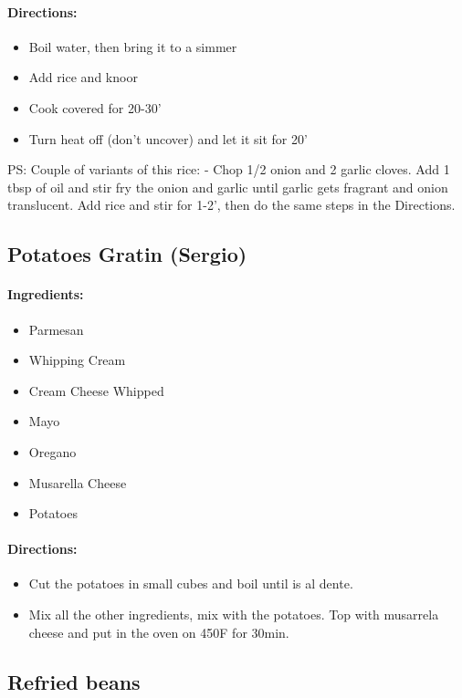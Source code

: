 \documentclass{article}
\begin{document}
\paragraph{Directions:}
\begin{itemize}
	\item Boil water, then bring it to a simmer
	\item Add rice and knoor
	\item Cook covered for 20-30'
	\item Turn heat off (don't uncover) and let it sit for 20'
\end{itemize} 

PS: Couple of variants of this rice: - Chop 1/2 onion and 2 garlic cloves. Add 1 tbsp of oil and stir fry the onion and garlic until garlic gets fragrant and onion translucent. Add rice and stir for 1-2’, then do the same
steps in the Directions.

\subsection{Potatoes Gratin (Sergio)}

\paragraph{Ingredients:}

\begin{itemize}
	\item Parmesan
	\item Whipping Cream
	\item Cream Cheese Whipped
	\item Mayo
	\item Oregano
	\item Musarella Cheese
	\item Potatoes
\end{itemize}

\paragraph{Directions:}
\begin{itemize}
	\item Cut the potatoes in small cubes and boil until is al dente.
	\item Mix all the other ingredients, mix with the potatoes. Top with musarrela cheese and put in the oven on 450F for 30min.
\end{itemize}

\subsection{Refried beans}
\end{document}
